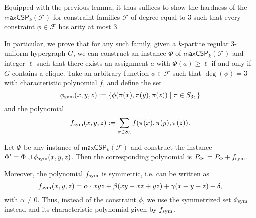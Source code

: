 \documentclass[a4paper,UKenglish,cleveref, autoref, thm-restate,numberwithinsect]{lipics-v2021}
\newcommand{\phisym}{\phi_{\rm sym}}
\newcommand{\fsym}{f_{\rm sym}}
\newcommand{\maxcspk}{\textsf{maxCSP}_{k}}
\newcommand{\Fam}{\mathcal{F}}
\begin{document}
Equipped with the previous lemma, it thus suffices to show the hardness of the $\maxcspk(\Fam)$ for constraint families $\Fam$ of degree equal to $3$ such that every constraint $\phi\in \Fam$ has arity at most $3$.

In particular, we prove that for any such family, given a $k$-partite regular $3$-uniform hypergraph $G$, we can construct an instance $\Phi$ of $\maxcspk(\Fam)$ and integer $\ell$ such that there exists an assignment $a$ with $\Phi(a) \geq \ell$ if and only if $G$ contains a clique.
Take an arbitrary function $\phi\in \Fam$ such that $\deg(\phi) =3$ with characteristic polynomial $f$, and define the set \[\phi_{\rm sym}(x,y,z) := \{\phi(\pi(x), \pi(y), \pi(z))\mid \pi \in S_3,\}\] and the polynomial \[\fsym(x,y,z) := \sum_{\pi\in S_3}f(\pi(x), \pi(y),\pi(z)).\]
\begin{observation}\label{obs:sym-polynomial}
    Let $\Phi$ be any instance of $\maxcspk(\Fam)$ and construct the instance $\Phi' = \Phi \cup \phisym(x,y,z)$. 
    Then the corresponding polynomial is $P_{\Phi'} = P_\Phi + \fsym$.
\end{observation}
 Moreover, the polynomial $\fsym$ is symmetric, i.e. can be written as \begin{equation}\label{eq:fsym}
 \fsym(x,y,z) = \alpha \cdot xyz + \beta (xy+xz+yz) + \gamma(x+y+z) + \delta,   
 \end{equation} 
 with $\alpha\ne 0$.
 Thus, instead of the constraint $\phi$, we use the symmetrized set $\phi_{\rm sym}$ instead and its characteristic polynomial given by $\fsym$. 
\end{document}
